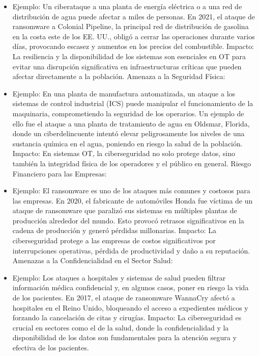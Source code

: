 \documentclass[
  letterpaper,
  DIV=11,
  numbers=noendperiod]{scrreprt}
\begin{document}
\begin{itemize}
\item
  Ejemplo: Un ciberataque a una planta de energía eléctrica o a una red
  de distribución de agua puede afectar a miles de personas. En 2021, el
  ataque de ransomware a Colonial Pipeline, la principal red de
  distribución de gasolina en la costa este de los EE. UU., obligó a
  cerrar las operaciones durante varios días, provocando escasez y
  aumentos en los precios del combustible. Impacto: La resiliencia y la
  disponibilidad de los sistemas son esenciales en OT para evitar una
  disrupción significativa en infraestructuras críticas que pueden
  afectar directamente a la población. Amenaza a la Seguridad Física:
\item
  Ejemplo: En una planta de manufactura automatizada, un ataque a los
  sistemas de control industrial (ICS) puede manipular el funcionamiento
  de la maquinaria, comprometiendo la seguridad de los operarios. Un
  ejemplo de ello fue el ataque a una planta de tratamiento de agua en
  Oldsmar, Florida, donde un ciberdelincuente intentó elevar
  peligrosamente los niveles de una sustancia química en el agua,
  poniendo en riesgo la salud de la población. Impacto: En sistemas OT,
  la ciberseguridad no solo protege datos, sino también la integridad
  física de los operadores y el público en general. Riesgo Financiero
  para las Empresas:
\item
  Ejemplo: El ransomware es uno de los ataques más comunes y costosos
  para las empresas. En 2020, el fabricante de automóviles Honda fue
  víctima de un ataque de ransomware que paralizó sus sistemas en
  múltiples plantas de producción alrededor del mundo. Esto provocó
  retrasos significativos en la cadena de producción y generó pérdidas
  millonarias. Impacto: La ciberseguridad protege a las empresas de
  costos significativos por interrupciones operativas, pérdida de
  productividad y daño a su reputación. Amenazas a la Confidencialidad
  en el Sector Salud:
\item
  Ejemplo: Los ataques a hospitales y sistemas de salud pueden filtrar
  información médica confidencial y, en algunos casos, poner en riesgo
  la vida de los pacientes. En 2017, el ataque de ransomware WannaCry
  afectó a hospitales en el Reino Unido, bloqueando el acceso a
  expedientes médicos y forzando la cancelación de citas y cirugías.
  Impacto: La ciberseguridad es crucial en sectores como el de la salud,
  donde la confidencialidad y la disponibilidad de los datos son
  fundamentales para la atención segura y efectiva de los pacientes.
\end{itemize}
\end{document}
